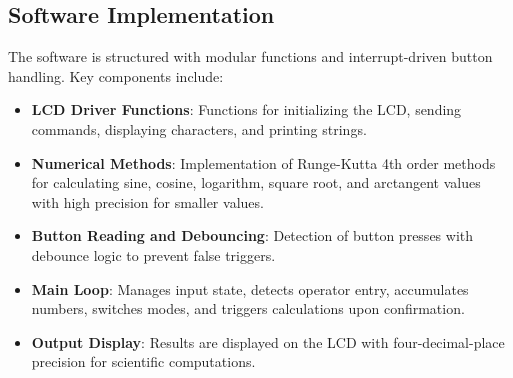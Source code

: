 \documentclass[journal]{IEEEtran}
\begin{document}
\subsection{Software Implementation}
The software is structured with modular functions and interrupt-driven button handling. Key components include:
\begin{itemize}
    \item \textbf{LCD Driver Functions}: Functions for initializing the LCD, sending commands, displaying characters, and printing strings.
    \item \textbf{Numerical Methods}: Implementation of Runge-Kutta 4th order methods for calculating sine, cosine, logarithm, square root, and arctangent values with high precision for smaller values.
    \item \textbf{Button Reading and Debouncing}: Detection of button presses with debounce logic to prevent false triggers.
    \item \textbf{Main Loop}: Manages input state, detects operator entry, accumulates numbers, switches modes, and triggers calculations upon confirmation.
    \item \textbf{Output Display}: Results are displayed on the LCD with four-decimal-place precision for scientific computations.
\end{itemize}
\end{document}

